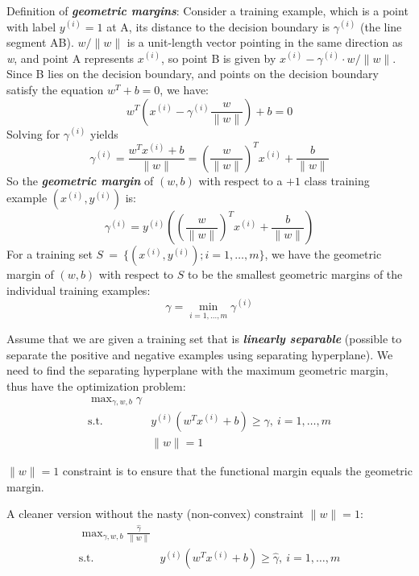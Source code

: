 \documentclass{article}
\begin{document}
Definition of \emph{\textbf{geometric margins}}:
Consider a training example, which is a point with label $y^{(i)}=1$ at A, its distance to the decision boundary is $\gamma^{(i)}$ (the line segment AB). $w/\lVert w \rVert$ is a unit-length vector pointing in the same direction as \emph{w}, and point A represents $x^{(i)}$, so point B is given by $x^{(i)}-\gamma^{(i)}\cdot w/\lVert w \rVert$. Since B lies on the decision boundary, and points on the decision boundary satisfy the equation $w^T+b=0$, we have:
\begin{equation*}
w^T\left(x^{(i)}-\gamma^{(i)}\frac{w}{\lVert w \rVert}\right) + b =0
\end{equation*}
Solving for $\gamma^{(i)}$ yields
\begin{equation*}
\gamma^{(i)}=\frac{w^Tx^{(i)}+b}{\lVert w\rVert}={\left(\frac{w}{\lVert w\rVert}\right)}^Tx^{(i)}+\frac{b}{\lVert w\rVert}
\end{equation*}
So the \emph{\textbf{geometric margin}} of $(w,b)$ with respect to a $+1$ class training example $(x^{(i)},y^{(i)})$ is:
\begin{equation*}
\gamma^{(i)}=y^{(i)}\left(\left(\frac{w}{\lVert w\rVert}\right)^T x^{(i)}+\frac{b}{\lVert w\rVert}\right)
\end{equation*}
For a training set $S\ =\ \{(x^{(i)},y^{(i)});i=1,\ldots,m\}$, we have the geometric margin of $(w,b)$ with respect to $S$ to be the smallest geometric margins of the individual training examples:
\begin{equation*}
\gamma=\min_{i=1,\ldots,m}\gamma^{(i)}
\end{equation*}

Assume that we are given a training set that is \emph{\textbf{linearly separable}} (possible to separate the positive and negative examples using separating hyperplane).
We need to find the separating hyperplane with the maximum geometric margin, thus have the optimization problem:
\begin{align*}
\max\nolimits_{\gamma,w,b} \gamma \\
    \text{s.t.}\ &y^{(i)}(w^T x^{(i)}+b)\geq\gamma,\ i=1,\ldots,m \\
                  &\lVert w\rVert=1
\end{align*}

$\lVert w\rVert=1$ constraint is to ensure that the functional margin equals the geometric margin.

A cleaner version without the nasty (non-convex) constraint $\lVert w\rVert=1$:
\begin{align*}
\max\nolimits_{\gamma,w,b} \frac{\hat{\gamma}}{\lVert w\rVert} \\
    \text{s.t.}\ &y^{(i)}(w^Tx^{(i)}+b)\geq\hat{\gamma},\ i=1,\ldots,m
\end{align*}
\end{document}
